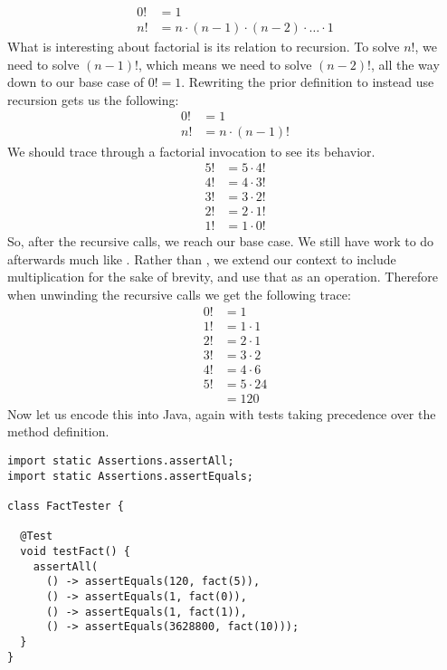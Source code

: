 \begin{align*}
    0! &= 1\\
    n! &= n \cdot (n - 1) \cdot (n - 2) \cdot \ldots \cdot 1
\end{align*}
What is interesting about factorial is its relation to recursion. To solve $n!$, we need to solve $(n-1)!$, which means we need to solve $(n-2)!$, all the way down to our base case of $0!=1$. Rewriting the prior definition to instead use recursion gets us the following: 
\begin{align*}
    0! &= 1\\
    n! &= n \cdot (n - 1)!
\end{align*}
We should trace through a factorial invocation to see its behavior.
\begin{align*}
    5! &= 5 \cdot 4!\\
    4! &= 4 \cdot 3!\\
    3! &= 3 \cdot 2!\\
    2! &= 2 \cdot 1!\\
    1! &= 1 \cdot 0!
\end{align*}
So, after the recursive calls, we reach our base case. We still have work to do afterwards much like . Rather than , we extend our context to include multiplication for the sake of brevity, and use that as an operation. Therefore when unwinding the recursive calls we get the following trace:
\begin{align*}
0! &= 1\\
1! &= 1 \cdot 1\\
2! &= 2 \cdot 1\\
3! &= 3 \cdot 2\\
4! &= 4 \cdot 6\\
5! &= 5 \cdot 24\\
   &= 120
\end{align*}
Now let us encode this into Java, again with tests taking precedence over the method definition.
\begin{lstlisting}[language=MyJava]
import static Assertions.assertAll;
import static Assertions.assertEquals;

class FactTester {
  
  @Test
  void testFact() {
    assertAll(
      () -> assertEquals(120, fact(5)),
      () -> assertEquals(1, fact(0)),
      () -> assertEquals(1, fact(1)),
      () -> assertEquals(3628800, fact(10)));
  }
}
\end{lstlisting}
